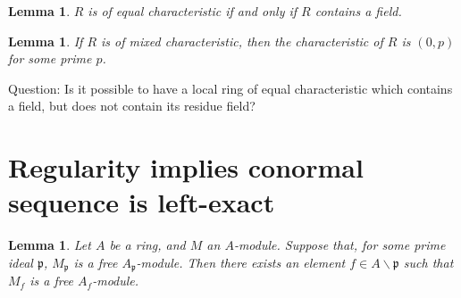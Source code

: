 \documentclass[a4paper]{article}
\newtheorem{lem}[thm]{Lemma}
\newcommand{\Ker}{\operatorname{Ker}}
\begin{document}
\begin{lem}
	\(R\) is of equal characteristic if and only if 
	\(R\) contains a field.
\end{lem}

\begin{lem}
	If \(R\) is of mixed characteristic, then the characteristic
	of \(R\) is \((0,p)\) for some prime \(p\).
\end{lem}

Question: Is it possible to have a local ring 
of equal characteristic which 
contains a field, but does not contain its residue field?



\section{Regularity implies conormal sequence is left-exact}

%
%

\begin{lem}
	Let \(A\) be a ring, and \(M\) an \(A\)-module.
	Suppose that, for some prime ideal \(\mathfrak{p}\),
	\(M_{\mathfrak{p}}\) is a free
	\(A_{\mathfrak{p}}\)-module.
	Then there exists an element 
	\(f \in A \smallsetminus \mathfrak{p}\)
	such that 
	\(M_{f}\) is a free \(A_{f}\)-module.
\end{lem}
\end{document}
